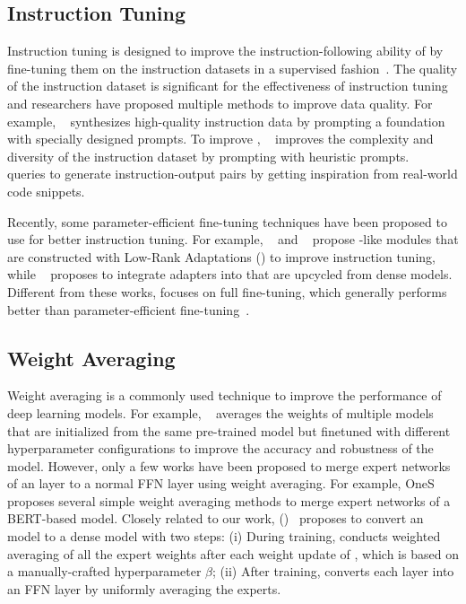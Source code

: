 \subsection{Instruction Tuning}
Instruction tuning is designed to improve the instruction-following ability of  by fine-tuning them on the instruction datasets in a supervised fashion~\cite{wei2022finetuned}. 
The quality of the instruction dataset is significant for the effectiveness of instruction tuning and researchers have proposed multiple methods to improve data quality. For example, \textsc{\selfinstruct}~\cite{wang2023selfinstruct} synthesizes high-quality instruction data by prompting a foundation \llm with specially designed prompts. To improve \textsc{\selfinstruct}, \evolinstruct~\cite{xu2023wizardlm} improves the complexity and diversity of the instruction dataset by prompting \chatgpt with heuristic prompts. \textsc{\ossinstruct}~\cite{wei2023magicoder} queries \chatgpt to generate instruction-output pairs by getting inspiration from real-world code snippets.

Recently, some parameter-efficient fine-tuning techniques have been proposed to use \moe for better instruction tuning. For example, \loramoe~\cite{dou2023loramoe} and \mocle~\cite{gou2024mixture} propose \moe-like modules that are constructed with Low-Rank Adaptations (\lora) to improve instruction tuning, while \pesc~\cite{wu2024parameterefficient} proposes to integrate adapters into \moe that are upcycled from dense models. Different from these works, \ours focuses on full fine-tuning, which generally performs better than parameter-efficient fine-tuning~\cite{chen2022revisiting}.

\subsection{Weight Averaging}\label{sec:weight_averaging}
Weight averaging is a commonly used technique to improve the performance of deep learning models. For example, \modelsoup~\cite{wortsman2022model} averages the weights of multiple models that are initialized from the same pre-trained model but finetuned with different hyperparameter configurations to improve the accuracy and robustness of the model. However, only a few works have been proposed to merge expert networks of an \moe layer to a normal FFN layer using weight averaging. For example, OneS~\cite{xue2022student} proposes several simple weight averaging methods to merge expert networks of a BERT-based \moe model. Closely related to our work, \ewafull (\ewa)~\cite{huang2023experts} proposes to convert an \moe model to a dense model with two steps: (i) During \moe training, \ewa conducts weighted averaging of all the expert weights after each weight update of \moe, which is based on a manually-crafted hyperparameter $\beta$; (ii) After training, \ewa converts each \moe layer into an FFN layer by uniformly averaging the experts. 

